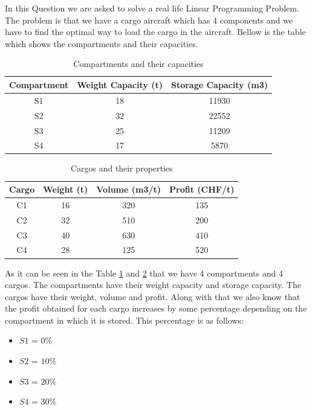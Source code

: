 \documentclass[unicode,11pt,a4paper,oneside,numbers=endperiod,openany]{scrartcl}
\begin{document}
In this Question we are asked to solve a real life Linear Programming Problem. The problem is that we have a cargo aircraft which has 4 components and we have to find the optimal way to load the cargo in the aircraft. Bellow is the table which shows the compartments and their capacities.

\begin{table}[H]
	\centering
	\begin{tabular}{|c|c|c|}
		\hline
		Compartment & Weight Capacity (t) & Storage Capacity (m3) \\
		\hline
		S1          & 18                  & 11930                 \\
		S2          & 32                  & 22552                 \\
		S3          & 25                  & 11209                 \\
		S4          & 17                  & 5870                  \\
		\hline
	\end{tabular}
	\caption{Compartments and their capacities}
	\label{tab:2.1}
\end{table}

\begin{table}[H]
	\centering
	\begin{tabular}{|c|c|c|c|}
		\hline
		Cargo & Weight (t) & Volume (m3/t) & Profit (CHF/t) \\
		\hline
		C1    & 16         & 320           & 135            \\
		C2    & 32         & 510           & 200            \\
		C3    & 40         & 630           & 410            \\
		C4    & 28         & 125           & 520            \\
		\hline
	\end{tabular}
	\caption{Cargos and their properties}
	\label{tab:2.2}
\end{table}

As it can be seen in the Table \ref{tab:2.1} and \ref{tab:2.2} that we have 4 compartments and 4 cargos. The compartments have their weight capacity and storage capacity. The cargos have their weight, volume and profit. Along with that we also know that the profit obtained for each cargo increases by some percentage depending on the compartment in which it is stored. This percentage is as follows:

\begin{itemize}
	\item $S1$ = $0\%$
	\item $S2$ = $10\%$
	\item $S3$ = $20\%$
	\item $S4$ = $30\%$
\end{itemize}
\end{document}
